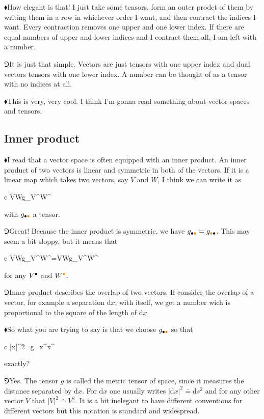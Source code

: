 \documentclass[10pt,oneside%
]{memoir}
\newenvironment{eqna}{\begin{IEEEeqnarray*}{c}}{\end{IEEEeqnarray*}\ignorespacesafterend}
\newcommand{\dd}{\mathrm{d}}
\newcommand{\hea}{\(\blacklozenge\)\;}
\newcommand{\heb}{\(\Game\)\;}
\newcommand{\coa}{{\color{black}\bullet}}
\newcommand{\cob}{{\color{oranssi}\bullet}}
\begin{document}
\hea How elegant is that! I just take some tensors, form an outer prodct of them by writing them in a row in whichever order I want, and then contract the indices I want. Every contraction removes one upper and one lower index. If there are equal numbers of upper and lower indices and I contract them all, I am left with a number.

\heb It is just that simple. Vectors are just tensors with one upper index and dual vectors tensors with one lower index. A number can be thought of as a tensor with no indices at all.

\hea This is very, very cool. I think I'm gonna read something about vector spaces and tensors.
\subsection{Inner product}
\hea I read that a vector space is often equipped with an inner product. An inner product of two vectors is linear and symmetric in both of the vectors. If it is a linear map which takes two vectors, say \(V\) and \(W\), I think we can write it as
\begin{eqna}
    V\cdot W\doteq g_{\coa\cob}V^\coa W^\cob
\end{eqna}
with \(g_{\coa\cob}\) a tensor.

\heb Great! Because the inner product is symmetric, we have \(g_{\coa\cob}=g_{\cob\coa}\). This may seem a bit sloppy, but it means that
\begin{eqna}
    V\cdot W\doteq g_{\coa\cob}V^\coa W^\cob=V\cdot W\doteq g_{\cob\coa}V^\coa W^\cob
\end{eqna}
for any \(V^\coa\) and \(W^\cob\).

\heb Inner product describes the overlap of two vectors. If consider the overlap of a vector, for example a separation \(\dd x\), with itself, we get a number wich is proportional to the square of the length of \(\dd x\).

\hea So what you are trying to say is that we choose \(g_{\coa\cob}\) so that
\begin{eqna}
    |\dd x|^2=g_{\coa\cob}\dd x^\coa\dd x^\cob
\end{eqna}
exactly?

\heb Yes. The tensor \(g\) is called the metric tensor of space, since it measures the distance separated by \(\dd x\). For \(\dd x\) one usually writes \(|\dd x|^2\doteq\dd s^2\) and for any other vector \(V\) that \(|V|^2\doteq V^2\). It is a bit inelegant to have different conventions for different vectors but this notation is standard and widespread.
\end{document}
